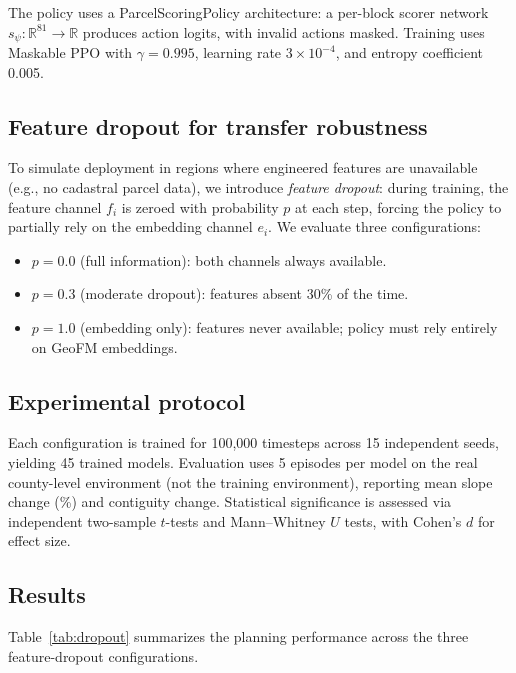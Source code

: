 \documentclass{article}
\begin{document}
The policy uses a ParcelScoringPolicy architecture: a per-block scorer network $s_\psi: \mathbb{R}^{81} \to \mathbb{R}$ produces action logits, with invalid actions masked. Training uses Maskable PPO \citep{huang2022maskableppo} with $\gamma = 0.995$, learning rate $3 \times 10^{-4}$, and entropy coefficient 0.005.

\subsection{Feature dropout for transfer robustness}

To simulate deployment in regions where engineered features are unavailable (e.g., no cadastral parcel data), we introduce \textit{feature dropout}: during training, the feature channel $f_i$ is zeroed with probability $p$ at each step, forcing the policy to partially rely on the embedding channel $e_i$. We evaluate three configurations:
\begin{itemize}
\item $p = 0.0$ (full information): both channels always available.
\item $p = 0.3$ (moderate dropout): features absent 30\% of the time.
\item $p = 1.0$ (embedding only): features never available; policy must rely entirely on GeoFM embeddings.
\end{itemize}

\subsection{Experimental protocol}

Each configuration is trained for 100{,}000 timesteps across 15 independent seeds, yielding 45 trained models. Evaluation uses 5 episodes per model on the real county-level environment (not the training environment), reporting mean slope change (\%) and contiguity change. Statistical significance is assessed via independent two-sample $t$-tests and Mann--Whitney $U$ tests, with Cohen's $d$ for effect size.

\subsection{Results}

Table~\ref{tab:dropout} summarizes the planning performance across the three feature-dropout configurations.
\end{document}
